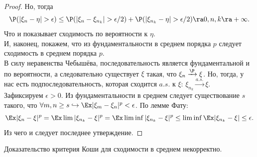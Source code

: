 \begin{proof}
    Но, тогда
    \[
        \P(|\xi_n - \eta| > \epsilon) \leq \P(|\xi_n - \xi_{n_k}| > \epsilon /2) + \P(|\xi_{n_k} - \eta| > \epsilon /2) \ra 0, n, k \ra +\infty.
    \]
    Что и показывает сходимость по вероятности к $\eta$. \\
    И, наконец, покажем, что из фундаментальности в среднем порядка $p$ следует сходимость в среднем порядка $p$. \\
    В силу неравенства Чебышёва, последовательность является фундаментальной и по вероятности, а следовательно существует $\xi$ такая, что $\xi_n \xrightarrow{\P} \xi$.
    Но, тогда, у нас есть подпоследовательность, которая сходится $a.s.$ к $\xi$: $\xi_{n_k} \xrightarrow{a.s.} \xi$. \\
    Зафиксируем $\epsilon > 0$. Из фундаментальности в среднем следует существование $s$ такого, что $\forall m, n \geq s \hookrightarrow \Ex |\xi_m - \xi_n|^p < \epsilon$.
    По лемме Фату:
    \[
        \Ex |\xi_n - \xi|^{p} = \Ex \lim |\xi_{n_k} - \xi|^{p} = \Ex \liminf |\xi_{n_k} - \xi|^{p} \leq \liminf \Ex |\xi_{n_k} - \xi| \leq \epsilon.
    \]
    Из чего и следует последнее утверждение.
\end{proof}
\begin{note}
    Доказательство критерия Коши для сходимости в среднем некорректно.
\end{note}

